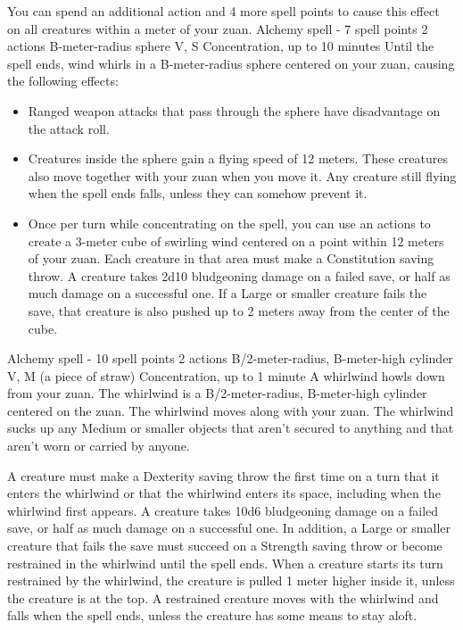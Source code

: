         You can spend an additional action and 4 more spell points to cause this effect on all creatures within a meter of your zuan.
        {Alchemy spell - 7 spell points}
        {2 actions}
        {B-meter-radius sphere}
        {V, S}
        {Concentration, up to 10 minutes}
        Until the spell ends, wind whirls in a B-meter-radius sphere centered on your zuan, causing the following effects:

        \begin{itemize}
            \item Ranged weapon attacks that pass through the sphere have disadvantage on the attack roll.
            \item Creatures inside the sphere gain a flying speed of 12 meters.
            These creatures also move together with your zuan when you move it.
            Any creature still flying when the spell ends falls, unless they can somehow prevent it.
            \item Once per turn while concentrating on the spell, you can use an actions to create a 3-meter cube of swirling wind centered on a point within 12 meters of your zuan.
            Each creature in that area must make a Constitution saving throw.
            A creature takes 2d10 bludgeoning damage on a failed save, or half as much damage on a successful one.
            If a Large or smaller creature fails the save, that creature is also pushed up to 2 meters away from the center of the cube.
        \end{itemize}
        {Alchemy spell - 10 spell points}
        {2 actions}
        {B/2-meter-radius, B-meter-high cylinder}
        {V, M (a piece of straw)}
        {Concentration, up to 1 minute}
        A whirlwind howls down from your zuan.
        The whirlwind is a B/2-meter-radius, B-meter-high cylinder centered on the zuan.
        The whirlwind moves along with your zuan.
        The whirlwind sucks up any Medium or smaller objects that aren't secured to anything and that aren't worn or carried by anyone.

        A creature must make a Dexterity saving throw the first time on a turn that it enters the whirlwind or that the whirlwind enters its space, including when the whirlwind first appears.
        A creature takes 10d6 bludgeoning damage on a failed save, or half as much damage on a successful one.
        In addition, a Large or smaller creature that fails the save must succeed on a Strength saving throw or become restrained in the whirlwind until the spell ends.
        When a creature starts its turn restrained by the whirlwind, the creature is pulled 1 meter higher inside it, unless the creature is at the top.
        A restrained creature moves with the whirlwind and falls when the spell ends, unless the creature has some means to stay aloft.

